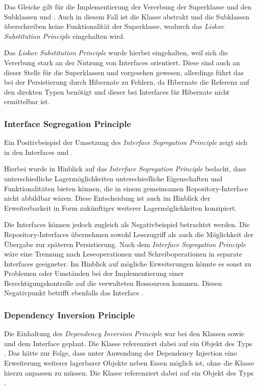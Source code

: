 Das Gleiche gilt für die Implementierung der Vererbung der Superklasse \href{}{} und den Subklassen \href{}{} und \href{}{}.
Auch in diesem Fall ist die Klasse \href{}{} abstrakt und die Subklassen überschreiben keine Funktionalität der Superklasse, wodurch das \textit{Liskov Substitution Principle} eingehalten wird.

Das \textit{Liskov Substitution Principle} wurde hierbei eingehalten, weil sich die Vererbung stark an der Nutzung von Interfaces orientiert.
Diese sind auch an dieser Stelle für die Superklassen \href{}{} und \href{}{} vorgesehen gewesen, allerdings führt das bei der Persistierung durch Hibernate zu Fehlern, da Hibernate die Referenz auf den direkten Typen benötigt und dieser bei Interfaces für Hibernate nicht ermittelbar ist.

\subsubsection*{Interface Segregation Principle}
Ein Positivbeispiel der Umsetzung des \textit{Interface Segregation Principle} zeigt sich in den Interfaces \href{}{} und \href{}{}.

Hierbei wurde in Hinblick auf das \textit{Interface Segregation Principle} bedacht, dass unterschiedliche Lagermöglichkeiten unterschiedliche Eigenschaften und Funktionalitäten bieten können, die in einem gemeinsamen Repository-Interface nicht abbildbar wären.
Diese Entscheidung ist auch im Hinblick der Erweiterbarkeit in Form zukünftiger weiterer Lagermöglichkeiten konzipiert.

Die Interfaces können jedoch zugleich als Negativbeispiel betrachtet werden.
Die Repository-Interfaces übernehmen sowohl Lesezugriff als auch die Möglichkeit der Übergabe zur späteren Persistierung.
Nach dem \textit{Interface Segregation Principle} wäre eine Trennung nach Leseoperationen und Schreiboperationen in separate Interfaces geeigneter.
Im Hinblick auf mögliche Erweiterungen könnte es sonst zu Problemen oder Umständen bei der Implementierung einer Berechtigungskontrolle auf die verwalteten Ressourcen kommen.
Diesen Negativpunkt betrifft ebenfalls das Interface \href{}{}.

\subsubsection*{Dependency Inversion Principle}
Die Einhaltung des \textit{Dependency Inversion Principle} war bei den Klassen \href{}{} sowie \href{}{} und dem Interface \href{}{} geplant.
Die Klasse \href{}{} referenziert dabei auf ein Objekt des Typs \href{}{}. 
Das hätte zur Folge, dass unter Anwendung der Dependency Injection eine Erweiterung weiterer lagerbarer Objekte neben Essen möglich ist, ohne die Klasse \href{}{} hierzu anpassen zu müssen. 
Die Klasse \href{}{} referenziert dabei auf ein Objekt des Typs \href{}{}.

